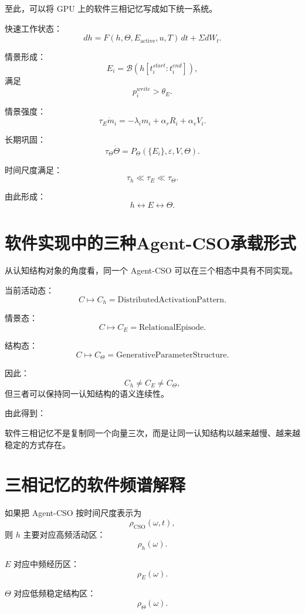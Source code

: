 至此，可以将 GPU 上的软件三相记忆写成如下统一系统。

快速工作状态：
\[
dh
=
F
(
h,
\Theta,
E_{\mathrm{active}},
u,
T
)\,dt
+
\Sigma dW_t.
\]

情景形成：
\[
E_i
=
\mathcal B
\left(
h[t_i^{start}:t_i^{end}]
\right),
\]
满足
\[
p_i^{write}>\theta_E.
\]

情景强度：
\[
\tau_E\dot m_i
=
-\lambda_i m_i
+
\alpha_rR_i
+
\alpha_vV_i.
\]

长期巩固：
\[
\tau_\Theta\dot\Theta
=
P_\Theta
(
\{E_i\},
\varepsilon,
V,
\Theta
).
\]

时间尺度满足：
\[
\boxed{
\tau_h
\ll
\tau_E
\ll
\tau_\Theta.
}
\]

由此形成：
\[
\boxed{
h
\leftrightarrow
E
\leftrightarrow
\Theta.
}
\]

\section{软件实现中的三种Agent-CSO承载形式}

从认知结构对象的角度看，同一个 Agent-CSO 可以在三个相态中具有不同实现。

当前活动态：
\[
C
\mapsto
C_h
=
\mathrm{DistributedActivationPattern}.
\]

情景态：
\[
C
\mapsto
C_E
=
\mathrm{RelationalEpisode}.
\]

结构态：
\[
C
\mapsto
C_\Theta
=
\mathrm{GenerativeParameterStructure}.
\]

因此：
\[
\boxed{
C_h
\neq
C_E
\neq
C_\Theta,
}
\]
但三者可以保持同一认知结构的语义连续性。

由此得到：
\begin{statementbox}
\centering
{}
\end{statementbox}

软件三相记忆不是复制同一个向量三次，而是让同一认知结构以越来越慢、越来越稳定的方式存在。

\section{三相记忆的软件频谱解释}

如果把 Agent-CSO 按时间尺度表示为
\[
\rho_{\mathrm{CSO}}(\omega,t),
\]
则 $h$ 主要对应高频活动区：
\[
\rho_h(\omega).
\]

$E$ 对应中频经历区：
\[
\rho_E(\omega).
\]

$\Theta$ 对应低频稳定结构区：
\[
\rho_\Theta(\omega).
\]

